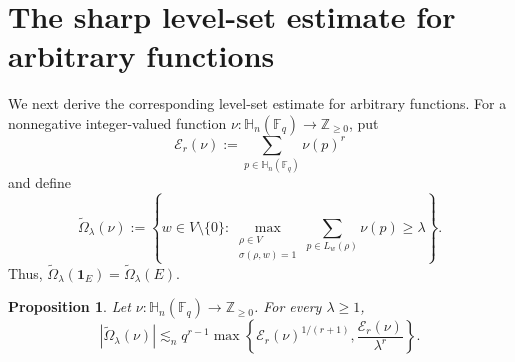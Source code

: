 \documentclass[11pt,letterpaper]{amsart}
\numberwithin{equation}{section}
\newtheorem{proposition}[proposition]{Proposition}
\theoremstyle{definition}
\theoremstyle{remark}
\newcommand{\Fq}{\mathbb F_q}
\newcommand{\HH}{\mathbb H}
\newcommand{\one}{\mathbf 1}
\begin{document}
\section{The sharp level-set estimate for arbitrary functions}
\label{sec:function-level-set}

We next derive the corresponding level-set estimate
for arbitrary functions. For a nonnegative integer-valued function
$\nu:\HH_n(\Fq)\to\mathbb Z_{\geq0}$, put
\[
 \mathcal E_r(\nu)
 :=\sum_{p\in\HH_n(\Fq)}\nu(p)^r
\]
and define
\begin{equation}\label{eq:weighted-normalized-rich-vectors}
 \widetilde\Omega_\lambda(\nu)
 :=
 \left\{w\in V\setminus\{0\}:
 \max_{\substack{\rho\in V\\\sigma(\rho,w)=1}}
 \sum_{p\in L_w(\rho)}\nu(p)\geq\lambda
 \right\}.
\end{equation}
Thus, $\widetilde\Omega_\lambda(\one_E)=\widetilde\Omega_\lambda(E)$.

\begin{proposition}
\label{prop:weighted-affine-rich}
Let $\nu:\HH_n(\Fq)\to\mathbb Z_{\geq0}$.  For every
$\lambda\geq1$,
\begin{equation}\label{eq:weighted-affine-rich}
 |\widetilde\Omega_\lambda(\nu)|
 \lesssim_n
 q^{r-1}
 \max\left\{
 \mathcal E_r(\nu)^{1/(r+1)},
 \frac{\mathcal E_r(\nu)}{\lambda^r}
 \right\}.
\end{equation}
\end{proposition}
\end{document}
